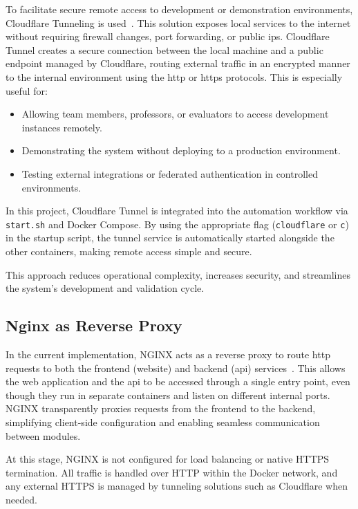 To facilitate secure remote access to development or demonstration environments, Cloudflare Tunneling is used~\cite{cloudflare-tunnel-docs}. This solution exposes local services to the internet without requiring firewall changes, port forwarding, or public \ac{ip}s. Cloudflare Tunnel creates a secure connection between the local machine and a public endpoint managed by Cloudflare, routing external traffic in an encrypted manner to the internal environment using the \ac{http} or \ac{https} protocols. This is especially useful for:

\begin{itemize}
    \item Allowing team members, professors, or evaluators to access development instances remotely.
    \item Demonstrating the system without deploying to a production environment.
    \item Testing external integrations or federated authentication in controlled environments.
\end{itemize}

In this project, Cloudflare Tunnel is integrated into the automation workflow via \texttt{start.sh} and Docker Compose. By using the appropriate flag (\texttt{cloudflare} or \texttt{c}) in the startup script, the tunnel service is automatically started alongside the other containers, making remote access simple and secure.

This approach reduces operational complexity, increases security, and streamlines the system's development and validation cycle.

\subsection{Nginx as Reverse Proxy} \label{subsec:nginx_reverse_proxy}

In the current implementation, NGINX acts as a reverse proxy to route \ac{http} requests to both the frontend (website) and backend (\ac{api}) services~\cite{nginx-docs}. This allows the web application and the \ac{api} to be accessed through a single entry point, even though they run in separate containers and listen on different internal ports. NGINX transparently proxies requests from the frontend to the backend, simplifying client-side configuration and enabling seamless communication between modules.

At this stage, NGINX is not configured for load balancing or native HTTPS termination. All traffic is handled over HTTP within the Docker network, and any external HTTPS is managed by tunneling solutions such as Cloudflare when needed.

